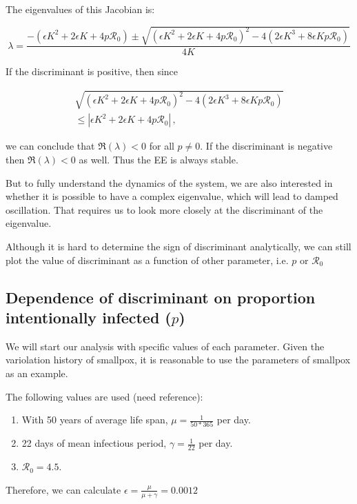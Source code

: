 \documentclass[12pt]{article}
\newcommand{\R}{\mathcal{R}}
\begin{document}
The eigenvalues of this Jacobian is:

\begin{equation}
\lambda = \frac{-(\epsilon K^2+2\epsilon K +4p\mathcal{R}_0) \pm \sqrt{(\epsilon K^2+2\epsilon K +4p\mathcal{R}_0)^2-4(2\epsilon K^3+8\epsilon Kp\mathcal{R}_0)}}{4K}
\end{equation}

If the discriminant is positive, then since
%
\begin{linenomath*}
\begin{multline}\label{}
\sqrt{(\epsilon K^2+2\epsilon K +4p\mathcal{R}_0)^2-4(2\epsilon
  K^3+8\epsilon Kp\mathcal{R}_0)} \\
 \leq \left|\epsilon K^2+2\epsilon K +4p\mathcal{R}_0\right|  \,,
\end{multline}
\end{linenomath*}
%
we can conclude that $\Re(\lambda)<0$ for all $p\neq 0$. If the discriminant is negative then $\Re(\lambda)<0$ as well.  Thus the EE is always stable.

But to fully understand the dynamics of the system, we are also interested in whether it is possible to have a complex eigenvalue, which will lead to damped oscillation. That requires us to look more closely at the discriminant of the eigenvalue.

Although it is hard to determine the sign of discriminant analytically, we can still plot the value of discriminant as a function of other parameter, i.e. $p$ or $\R_0$

\subsection{Dependence of discriminant on proportion intentionally infected ($p$)}

We will start our analysis with specific values of each parameter. Given the variolation history of smallpox, it is reasonable to use the parameters of smallpox as an example.

The following values are used (need reference): 
\begin{enumerate}
\item With 50 years of average life span, $\mu=\frac{1}{50*365}$ per day.
\item 22 days of mean infectious period, $\gamma=\frac{1}{22}$ per day.
\item $\R_0=4.5$.
\end{enumerate}
Therefore, we can calculate $\epsilon=\frac{\mu}{\mu+\gamma}=0.0012$
\end{document}
